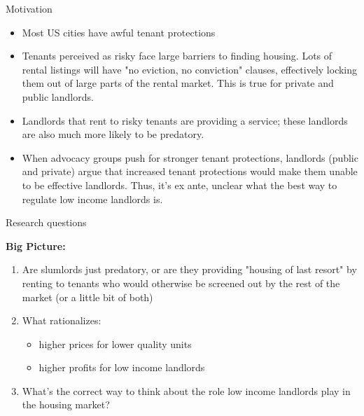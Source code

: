 \documentclass[10pt, xcolor=dvipsnames]{beamer}
\begin{document}
\begin{frame}{Motivation}

\begin{itemize}
    \item Most US cities have awful tenant protections
    \item Tenants perceived as risky face large barriers to finding housing. Lots of rental listings will have "no eviction, no conviction" clauses, effectively locking them out of large parts of the rental market. This is true for private and public landlords.
    \item Landlords that rent to risky tenants are providing a service; these landlords are also much more likely to be predatory.
    \item When advocacy groups push for stronger tenant protections, landlords (public and private) argue that increased tenant protections would make them unable to be effective landlords. Thus, it's ex ante, unclear what the best way to regulate low income landlords is.
\end{itemize}
\end{frame}


\begin{frame}{Research questions}

\textbf{Big Picture:} \\
\vspace{0.25cm}
\begin{enumerate}
    \item Are slumlords just predatory, or are they providing "housing of last resort" by renting to tenants who would otherwise be screened out by the rest of the market (or a little bit of both) 
    \item What rationalizes:
\begin{itemize}
    \item higher prices for lower quality units
    \item higher profits for low income landlords
\end{itemize}

\item What's the correct way to think about the role low income landlords play in the housing market?
\end{enumerate}
\end{frame}

\end{document}
